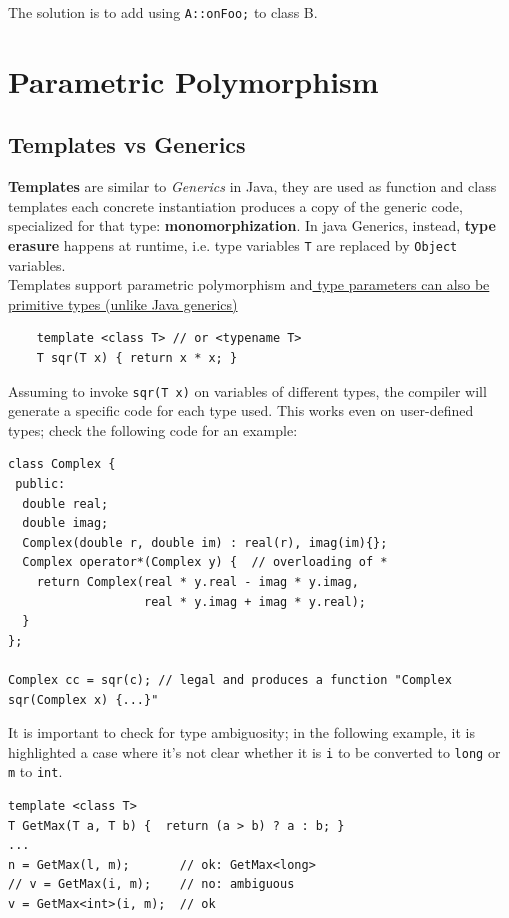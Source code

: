 The solution is to add using \lstinline|A::onFoo;| to class B.

\section{Parametric Polymorphism}
\subsection{Templates vs Generics}
\lstset{language=C++}

\textbf{Templates} are similar to \textit{Generics} in Java, 
they are used as function and class templates
each concrete instantiation produces a copy of the generic code, specialized for that type:
\textbf{monomorphization}.
In java Generics, instead, \textbf{type erasure} happens at runtime, i.e. type variables \lstinline{T} are replaced by \lstinline{Object} variables.\\
Templates support parametric polymorphism and\ul{ type parameters can also be primitive types (unlike Java generics)}
\begin{lstlisting}
    template <class T> // or <typename T>
    T sqr(T x) { return x * x; }
\end{lstlisting}
Assuming to invoke \lstinline{sqr(T x)} on variables of different types, the compiler will generate a specific code for each type used.
This works even on user-defined types;
check the following code for an example:
\begin{lstlisting}
class Complex {
 public:
  double real;
  double imag;
  Complex(double r, double im) : real(r), imag(im){};
  Complex operator*(Complex y) {  // overloading of *
    return Complex(real * y.real - imag * y.imag,
                   real * y.imag + imag * y.real);
  }
};

Complex cc = sqr(c); // legal and produces a function "Complex sqr(Complex x) {...}"
\end{lstlisting}

It is important to check for type ambiguosity;
in the following example, it is highlighted a case where it's not clear whether it is \lstinline{i} to be converted to \lstinline{long} or \lstinline{m} to \lstinline{int}.
\begin{lstlisting}
template <class T>
T GetMax(T a, T b) {  return (a > b) ? a : b; }
...
n = GetMax(l, m);       // ok: GetMax<long>
// v = GetMax(i, m);    // no: ambiguous
v = GetMax<int>(i, m);  // ok
\end{lstlisting}

